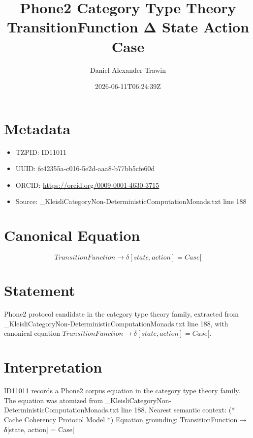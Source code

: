 \documentclass[11pt]{article}
\title{Phone2 Category Type Theory TransitionFunction Δ State Action Case}
\author{Daniel Alexander Trawin}
\date{2026-06-11T06:24:39Z}
\begin{document}
\maketitle
\section*{Metadata}
\begin{itemize}
\item TZPID: ID11011
\item UUID: fc42355a-c016-5e2d-aaa8-b77bb5cfe60d
\item ORCID: \url{https://orcid.org/0009-0001-4630-3715}
\item Source: _KleisliCategoryNon-DeterministicComputationMonads.txt line 188
\end{itemize}
\section*{Canonical Equation}
\[
TransitionFunction → δ[state, action] = Case[
\]
\section*{Statement}
Phone2 protocol candidate in the category type theory family, extracted from _KleisliCategoryNon-DeterministicComputationMonads.txt line 188, with canonical equation $TransitionFunction → δ[state, action] = Case[$.
\section*{Interpretation}
ID11011 records a Phone2 corpus equation in the category type theory family. The equation was atomized from _KleisliCategoryNon-DeterministicComputationMonads.txt line 188. Nearest semantic context: (* Cache Coherency Protocol Model *) Equation grounding: TransitionFunction → δ[state, action] = Case[
\end{document}
